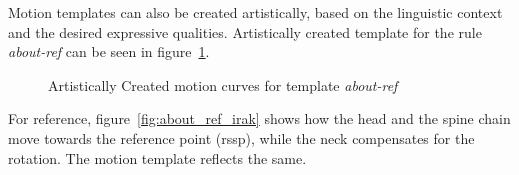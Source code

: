 \documentclass[../../main.tex]{subfiles}
\begin{document}
Motion templates can also be created artistically, based on the linguistic context and the desired expressive qualities. Artistically created template for the rule \emph{about-ref} can be seen in figure~\ref{fig:motion_curves_template_artist}.

\begin{figure}
     \centering
    \caption{Artistically Created motion curves for template \emph{about-ref}}
    \label{fig:motion_curves_template_artist}
\end{figure}

For reference, figure~\ref{fig:about_ref_irak} shows how the head and the spine chain move towards the reference point (\gls{rssp}), while the neck compensates for the rotation. The motion template reflects the same. 
\end{document}
